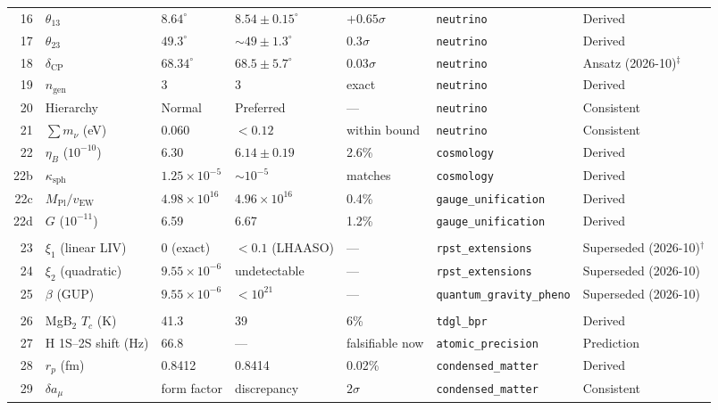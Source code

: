 \documentclass[aps,prd,twocolumn,superscriptaddress,longbibliography,nofootinbib]{revtex4-2}
\newcommand{\vEW}{v_{\mathrm{EW}}}
\newcommand{\MPl}{M_{\mathrm{Pl}}}
\begin{document}
\begin{table}[t]
\begin{ruledtabular}
\begin{tabular}{rllllll}
16 & $\theta_{13}$ & $8.64^\circ$ & $8.54\pm0.15^\circ$ & $+0.65\sigma$ & \texttt{neutrino} & Derived \\
17 & $\theta_{23}$ & $49.3^\circ$ & $\sim49\pm1.3^\circ$ & $0.3\sigma$ & \texttt{neutrino} & Derived \\
18 & $\delta_{\mathrm{CP}}$ & $68.34^\circ$ & $68.5\pm5.7^\circ$ & $0.03\sigma$ & \texttt{neutrino} & Ansatz (2026-10)$^\ddagger$ \\
19 & $n_{\mathrm{gen}}$ & 3 & 3 & exact & \texttt{neutrino} & Derived \\
20 & Hierarchy & Normal & Preferred & --- & \texttt{neutrino} & Consistent \\
21 & $\sum m_\nu$ (eV) & 0.060 & $<0.12$ & within bound & \texttt{neutrino} & Consistent \\
22 & $\eta_B$ ($10^{-10}$) & 6.30 & $6.14\pm0.19$ & 2.6\% & \texttt{cosmology} & Derived \\
22b & $\kappa_{\mathrm{sph}}$ & $1.25\times10^{-5}$ & $\sim10^{-5}$ & matches & \texttt{cosmology} & Derived \\
22c & $\MPl/\vEW$ & $4.98\times10^{16}$ & $4.96\times10^{16}$ & 0.4\% & \texttt{gauge\_unification} & Derived \\
22d & $G$ ($10^{-11}$) & 6.59 & 6.67 & 1.2\% & \texttt{gauge\_unification} & Derived \\
\colrule
\multicolumn{7}{c}{\textit{Quantum Gravity}} \\
23 & $\xi_1$ (linear LIV) & 0 (exact) & $<0.1$ (LHAASO) & --- & \texttt{rpst\_extensions} & Superseded (2026-10)$^\dagger$ \\
24 & $\xi_2$ (quadratic) & $9.55\times10^{-6}$ & undetectable & --- & \texttt{rpst\_extensions} & Superseded (2026-10) \\
25 & $\beta$ (GUP) & $9.55\times10^{-6}$ & $<10^{21}$ & --- & \texttt{quantum\_gravity\_pheno} & Superseded (2026-10) \\
\colrule
\multicolumn{7}{c}{\textit{Condensed Matter \& Atomic}} \\
26 & MgB$_2$ $T_c$ (K) & 41.3 & 39 & 6\% & \texttt{tdgl\_bpr} & Derived \\
27 & H 1S--2S shift (Hz) & 66.8 & --- & falsifiable now & \texttt{atomic\_precision} & Prediction \\
28 & $r_p$ (fm) & 0.8412 & 0.8414 & 0.02\% & \texttt{condensed\_matter} & Derived \\
29 & $\delta a_\mu$ & form factor & discrepancy & $2\sigma$ & \texttt{condensed\_matter} & Consistent \\

\end{tabular}
\end{ruledtabular}
\end{table}
\end{document}

